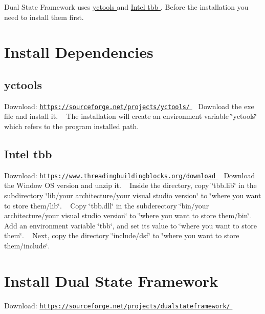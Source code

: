 Dual State Framework uses \hyperlink{_win_yctools_win}{yctools } and \hyperlink{_win_tbb_win}{Intel tbb }. Before the installation you need to install them first.\hypertarget{_win_dependencies_win}{}\section{Install Dependencies}\label{_win_dependencies_win}
\hypertarget{_win_yctools_win}{}\subsection{yctools}\label{_win_yctools_win}
Download\+: \hyperlink{}{\href{https://sourceforge.net/projects/yctools/}{\tt https\+://sourceforge.\+net/projects/yctools/} } ~\newline
 Download the exe file and install it. ~\newline
 The installation will create an environment variable \char`\"{}yctools\char`\"{} which refers to the program installed path.\hypertarget{_win_tbb_win}{}\subsection{Intel tbb}\label{_win_tbb_win}
Download\+: \hyperlink{}{\href{https://www.threadingbuildingblocks.org/download}{\tt https\+://www.\+threadingbuildingblocks.\+org/download} } ~\newline
 Download the Window O\+S version and unzip it. ~\newline
 Inside the directory, copy \char`\"{}tbb.\+lib\char`\"{} in the subdirectory \char`\"{}lib/your architecture/your visual studio version\char`\"{} to \char`\"{}where you want to store them/lib\char`\"{}. ~\newline
 Copy \char`\"{}tbb.\+dll\char`\"{} in the subderectory \char`\"{}bin/your architecture/your visual studio version\char`\"{} to \char`\"{}where you want to store them/bin\char`\"{}. ~\newline
 Add an environment variable \char`\"{}tbb\char`\"{}, and set its value to \char`\"{}where you want to store them\char`\"{}. ~\newline
 Next, copy the directory \char`\"{}include/dsf\char`\"{} to \char`\"{}where you want to store them/include\char`\"{}. \hypertarget{_win_dsf_win}{}\section{Install Dual State Framework}\label{_win_dsf_win}
Download\+: \hyperlink{}{\href{https://sourceforge.net/projects/dualstateframework/}{\tt https\+://sourceforge.\+net/projects/dualstateframework/} } ~\newline
